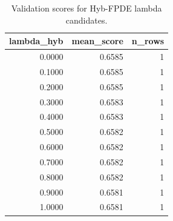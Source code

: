 \begin{table}[t]
\caption{Validation scores for Hyb-FPDE lambda candidates.}
\label{tab:lambda_distribution_computed}
\centering
\begin{tabular}{rrr}
\toprule
lambda\_hyb & mean\_score & n\_rows \\
\midrule
0.0000 & 0.6585 & 1 \\
0.1000 & 0.6585 & 1 \\
0.2000 & 0.6585 & 1 \\
0.3000 & 0.6583 & 1 \\
0.4000 & 0.6583 & 1 \\
0.5000 & 0.6582 & 1 \\
0.6000 & 0.6582 & 1 \\
0.7000 & 0.6582 & 1 \\
0.8000 & 0.6582 & 1 \\
0.9000 & 0.6581 & 1 \\
1.0000 & 0.6581 & 1 \\
\bottomrule
\end{tabular}

\end{table}
